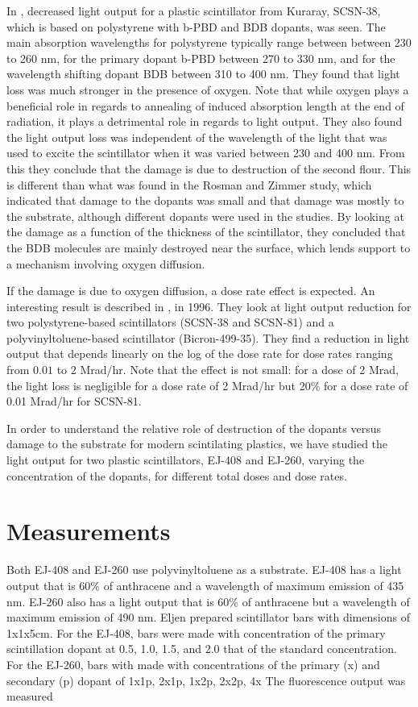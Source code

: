 \documentclass[review]{elsarticle}
\begin{document}
In \cite{Wick1991472}, decreased light
output for a plastic scintillator from Kuraray, SCSN-38, which
is based on polystyrene with b-PBD and BDB dopants, was seen.
The main absorption wavelengths for polystyrene typically range between
between 230 to 260 nm, for the primary dopant b-PBD between 270 to 330 nm,
and for the wavelength shifting dopant BDB between 310 to 400 nm.
They found that light loss was much stronger in the presence of oxygen.
Note that while oxygen plays a beneficial role in regards
to annealing of induced absorption length at the end of radiation, 
it plays a detrimental role in 
regards to light output.  
They also found the light output loss
was independent of the wavelength of the light
that was used to excite the scintillator when it
was varied between 230 and 400 nm.
From this they conclude that the damage is due to destruction
of the second flour.  This is different than what was found in
the Rosman and Zimmer study, which indicated that damage to the dopants was
small and that damage was mostly to the substrate,
although different dopants were used in the studies.
By looking at the damage as a function of the thickness of the scintillator,
they concluded that the BDB molecules are mainly destroyed
near the surface, which lends support to a mechanism involving
oxygen diffusion.

If the damage is due to oxygen diffusion, a dose rate effect
is expected.
An interesting result is described in \cite{Biagtan1996125}, in 1996.  They look at light output reduction for two
polystyrene-based scintillators (SCSN-38 and SCSN-81) and a
polyvinyltoluene-based scintillator (Bicron-499-35).  
They find a reduction in light output that depends linearly on the
log of the dose rate for dose rates ranging from $0.01$ to
$2$ Mrad/hr.  Note that the effect is not small: for a
dose of 2 Mrad, the light loss is negligible for a dose rate
of 2 Mrad/hr but 20\% for a dose rate of 0.01 Mrad/hr for SCSN-81.

In order to understand the relative role of destruction of the dopants versus damage to the substrate for modern scintilating plastics,
we have studied the light output for two plastic scintillators, EJ-408 and EJ-260, varying the concentration of the dopants, for
different total doses and dose rates.  




\section{Measurements}
Both EJ-408 and EJ-260 use polyvinyltoluene as a substrate.  EJ-408 has a light output that is 60\% of anthracene and a wavelength of maximum emission of 435 nm.  
EJ-260 also has a light output that is 60\% of anthracene but a wavelength of maximum emission of 490 nm.  Eljen prepared scintillator bars
with dimensions of 1x1x5cm.  For the EJ-408, bars were made with concentration of the primary scintillation dopant at 0.5, 1.0, 1.5, and 2.0 that of
the standard concentration.  For the EJ-260, bars with made with concentrations of the primary (x) and secondary (p) dopant of 1x1p, 2x1p, 1x2p, 2x2p, 4x
The fluorescence output was measured 
\end{document}
